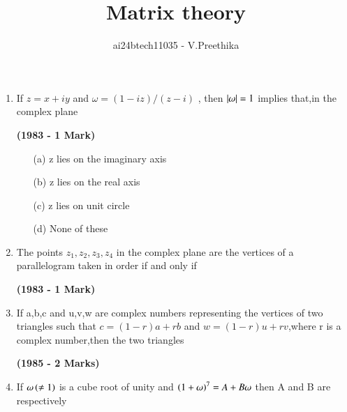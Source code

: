 \documentclass[journal,12pt,twocolumn]{IEEEtran}
\theoremstyle{remark}
\begin{document}

\vspace{3cm}

\title{Matrix theory}
\author{ai24btech11035 - V.Preethika}
\maketitle
\newpage
\bigskip

\renewcommand{\thefigure}{\theenumi}
\renewcommand{\thetable}{\theenumi}

\begin{enumerate}[start=6]
\item If $z=x+iy$ and $\omega=(1-iz)/(z-i)$ , then $\left\vert\omega\right\vert=1$ implies that,in the complex plane

\hfill{\textbf{(1983 - 1 Mark)}}

\begin{enumerate}
\item[(a)] z lies on the imaginary axis
\item[(b)] z lies on the real axis
\item[(c)] z lies on unit circle
\item[(d)] None of these
\end{enumerate}
\item The points $z_1,z_2,z_3,z_4$ in the complex plane are the vertices of a parallelogram taken in order if and only if

\hfill{\textbf{(1983 - 1 Mark)}}

\begin{enumerate}
\end{enumerate}
\item If a,b,c and u,v,w are complex numbers representing the vertices of two triangles such that $c=(1-r)a+rb$ and $w=(1-r)u+rv$,where r is a complex number,then the two triangles

\hfill{\textbf{(1985 - 2 Marks)}}

\begin{enumerate}
\end{enumerate}
\item If $\omega\left(\neq1\right)$ is a cube root of unity and $\left(1+\omega\right)^7=A+B\omega$ then A and B are respectively


\end{enumerate}
\end{document}
